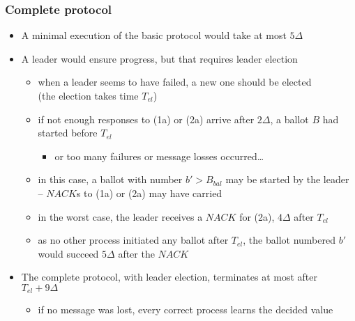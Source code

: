\documentclass[10 pt]{beamer}
\begin{document}
\begin{frame}
  \frametitle{Complete protocol}
  
  \begin {itemize}
    \item A minimal execution of the basic protocol would take at most $5\Delta$
    \vspace{2 mm}
    \item A leader would ensure progress, but that requires leader election     
    \begin {itemize}
      \item when a leader seems to have failed, a new one should be elected\\
      (the election takes time $T_{el}$)
      \item if not enough responses to (1a) or (2a) arrive after $2\Delta$, a ballot $B$ had started before $T_{el}$
      \begin{itemize}
        \item or too many failures or message losses occurred\ldots %
      \end{itemize}
      \item in this case, a ballot with number $b' > B_{bal}$ may be started by the leader -- $NACK$s to (1a) or (2a) may have carried \bbal
      \item in the worst case, the leader receives a $NACK$ for (2a), $4\Delta$ after $T_{el}$
      \item as no other process initiated any ballot after $T_{el}$, the ballot numbered $b'$ would succeed $5\Delta$ after the $NACK$
    \end{itemize}
    \vspace{2 mm}
    \item The complete protocol, with leader election, terminates at most after $T_{el} + 9\Delta$
    \begin{itemize}
      \item if no message was lost, every correct process learns the decided value
    \end{itemize}   

  \end{itemize}
  
\end{frame}
\end{document}
